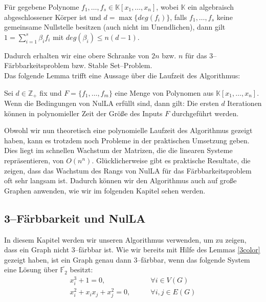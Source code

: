 \begin{corollary}
Für gegebene Polynome $f_1,\ldots,f_s \in \mathbb{K}[x_1,\ldots,x_n]$, wobei $\mathbb{K}$ ein algebraisch abgeschlossener Körper ist und $d = \max\{deg(f_i)\}$, falls $f_1,\ldots,f_s$ keine gemeinsame Nullstelle besitzen (auch nicht im Unendlichen), dann gilt $1 = \sum_{i=1}^s\beta_if_i$ mit $deg(\beta_i) \le n (d-1)$.
\end{corollary}

\noindent Dadurch erhalten wir eine obere Schranke von $2n$ bzw. $n$ für das 3--Färbbarkeitsproblem bzw. Stable Set--Problem. \\

\noindent Das folgende Lemma trifft eine Aussage über die Laufzeit des Algorithmus:
\begin{lemma}\label{polTime}
Sei $d \in \mathbb{Z}_+$ fix und $F = \{f_1,\ldots,f_m\}$ eine Menge von Polynomen aus $\mathbb{K}[x_1,\ldots,x_n]$. Wenn die Bedingungen von NulLA erfüllt sind, dann gilt: Die ersten $d$ Iterationen können in polynomieller Zeit der Größe des Inputs $F$ durchgeführt werden.
\end{lemma}

\noindent Obwohl wir nun theoretisch eine polynomielle Laufzeit des Algorithmus gezeigt haben, kann es trotzdem noch Probleme in der praktischen Umsetzung geben. Dies liegt im schnellen Wachstum der Matrizen, die die linearen Systeme repräsentieren, von $O(n^n)$. Glücklicherweise gibt es praktische Resultate, die zeigen, dass das Wachstum des Rangs von NulLA für das Färbbarkeitsproblem oft sehr langsam ist. Dadurch können wir den Algorithmus auch auf große Graphen anwenden, wie wir im folgenden Kapitel sehen werden. \cite{Ausgangsartikel}



\subsection{3--Färbbarkeit und NulLA} \label{3colorNulLA}

In diesem Kapitel werden wir unseren Algorithmus verwenden, um zu zeigen, dass ein Graph nicht 3--färbbar ist. Wie wir bereits mit Hilfe des Lemmas \ref{3color} gezeigt haben, ist ein Graph genau dann 3--färbbar, wenn das folgende System eine Lösung über $\overline{\mathbb{F}_2}$ besitzt:
\begin{align*}
x_i^3+1=0, \qquad &\forall i \in V(G)\\
x_i^2+x_ix_j+x_j^2=0, \qquad &\forall{i,j}\in E(G) \tag{$\ast$} 
\end{align*}

